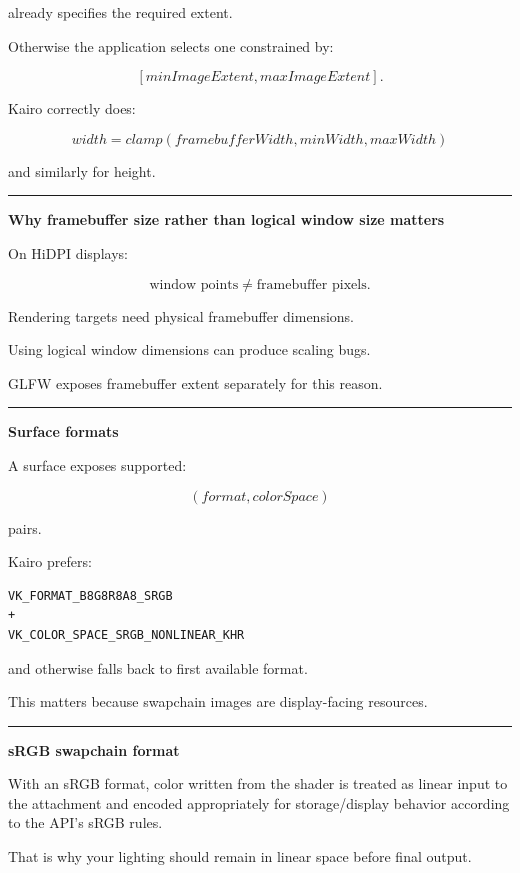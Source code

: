 already specifies the required extent.

Otherwise the application selects one constrained by:

\[
[minImageExtent,maxImageExtent].
\]

Kairo correctly does:

\[
width=
clamp(
framebufferWidth,
minWidth,
maxWidth
)
\]

and similarly for height.

\begin{center}\rule{0.5\linewidth}{0.5pt}\end{center}

\textbf{Why framebuffer size rather than logical window size matters}

On HiDPI displays:

\[
\text{window points}
\neq
\text{framebuffer pixels}.
\]

Rendering targets need physical framebuffer dimensions.

Using logical window dimensions can produce scaling bugs.

GLFW exposes framebuffer extent separately for this reason.

\begin{center}\rule{0.5\linewidth}{0.5pt}\end{center}

\textbf{Surface formats}

A surface exposes supported:

\[
(format,colorSpace)
\]

pairs.

Kairo prefers:

\begin{verbatim}
VK_FORMAT_B8G8R8A8_SRGB
+
VK_COLOR_SPACE_SRGB_NONLINEAR_KHR
\end{verbatim}

and otherwise falls back to first available format.

This matters because swapchain images are display-facing resources.

\begin{center}\rule{0.5\linewidth}{0.5pt}\end{center}

\textbf{sRGB swapchain format}

With an sRGB format, color written from the shader is treated as linear input to the attachment and encoded appropriately for storage/display behavior according to the API's sRGB rules.

That is why your lighting should remain in linear space before final output.

